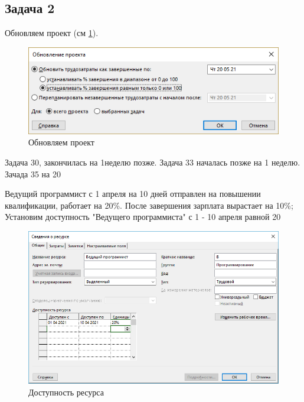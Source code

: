 \subsection{Задача 2}
Обновляем проект (см \ref{fig:412}).
\begin{figure}[H]
	\centering
	\includegraphics[width=0.7\linewidth]{src/4_1_2}
	\caption{Обновляем проект}
	\label{fig:412}
\end{figure}

Задача 30, закончилась на 1неделю позже.
Задача 33 началась позже на 1 неделю.
Зачада 35 на 20%

Ведущий программист с 1 апреля на 10 дней отправлен на повышении квалификации, работает на 20\%. После завершения зарплата вырастает на 10\%;
Установим доступность "Ведущего программиста" с 1 - 10 апреля равной 20%
\begin{figure}[H]
	\centering
	\includegraphics[width=0.7\linewidth]{src/4_5}
	\caption{Доступность ресурса}
	\label{fig:45}
\end{figure}


